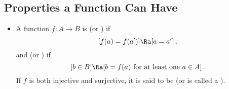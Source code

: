 
\subsection{Properties a Function Can Have}\label{func props}
\begin{itemize}
	\item A function $f : A \to B$ is 
	 (or 
	) if
	\[
		[f(a) = f(a')] \Ra [a = a']\,,
	\]
	and  (or 
	) if 
	\[
		[b \in B] \Ra [b = f(a) \text{ for at least one } a 
		\in A]\,.
	\]
	If $f$ is both injective and surjective, it is said to be 
	 (or is called a 
	).
\end{itemize}

